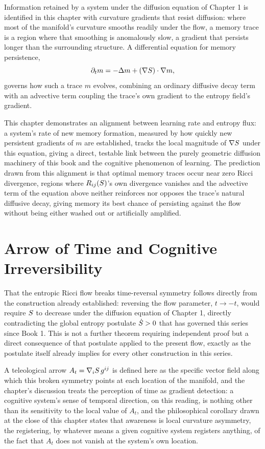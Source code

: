 Information retained by a system under the diffusion equation of Chapter 1 is identified in this chapter with curvature gradients that resist diffusion: where most of the manifold's curvature smooths readily under the flow, a memory trace is a region where that smoothing is anomalously slow, a gradient that persists longer than the surrounding structure. A differential equation for memory persistence,
\[
\partial_t m = -\Delta m + (\nabla S) \cdot \nabla m,
\]
governs how such a trace $m$ evolves, combining an ordinary diffusive decay term with an advective term coupling the trace's own gradient to the entropy field's gradient.

This chapter demonstrates an alignment between learning rate and entropy flux: a system's rate of new memory formation, measured by how quickly new persistent gradients of $m$ are established, tracks the local magnitude of $\nabla S$ under this equation, giving a direct, testable link between the purely geometric diffusion machinery of this book and the cognitive phenomenon of learning. The prediction drawn from this alignment is that optimal memory traces occur near zero Ricci divergence, regions where $R_{ij}(S)$'s own divergence vanishes and the advective term of the equation above neither reinforces nor opposes the trace's natural diffusive decay, giving memory its best chance of persisting against the flow without being either washed out or artificially amplified.

\chapter{Arrow of Time and Cognitive Irreversibility}

That the entropic Ricci flow breaks time-reversal symmetry follows directly from the construction already established: reversing the flow parameter, $t \to -t$, would require $S$ to decrease under the diffusion equation of Chapter 1, directly contradicting the global entropy postulate $\dot{S} > 0$ that has governed this series since Book 1. This is not a further theorem requiring independent proof but a direct consequence of that postulate applied to the present flow, exactly as the postulate itself already implies for every other construction in this series.

A teleological arrow $A_t = \nabla_i S \, g^{ij}$ is defined here as the specific vector field along which this broken symmetry points at each location of the manifold, and the chapter's discussion treats the perception of time as gradient detection: a cognitive system's sense of temporal direction, on this reading, is nothing other than its sensitivity to the local value of $A_t$, and the philosophical corollary drawn at the close of this chapter states that awareness is local curvature asymmetry, the registering, by whatever means a given cognitive system registers anything, of the fact that $A_t$ does not vanish at the system's own location.

